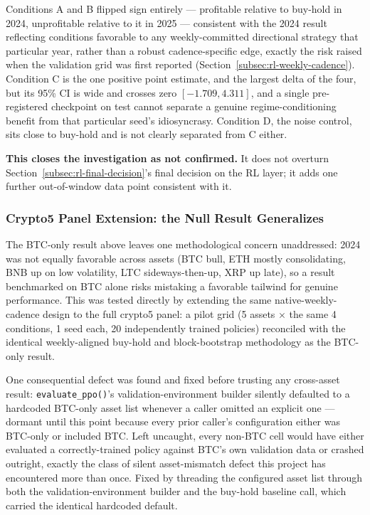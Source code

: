 Conditions A and B flipped sign entirely --- profitable relative to buy-hold in 2024, unprofitable relative to it in 2025 --- consistent with the 2024 result reflecting conditions favorable to any weekly-committed directional strategy that particular year, rather than a robust cadence-specific edge, exactly the risk raised when the validation grid was first reported (Section~\ref{subsec:rl-weekly-cadence}). Condition C is the one positive point estimate, and the largest delta of the four, but its 95\% CI is wide and crosses zero $[-1.709, 4.311]$, and a single pre-registered checkpoint on test cannot separate a genuine regime-conditioning benefit from that particular seed's idiosyncrasy. Condition D, the noise control, sits close to buy-hold and is not clearly separated from C either.

\textbf{This closes the investigation as not confirmed.} It does not overturn Section~\ref{subsec:rl-final-decision}'s final decision on the RL layer; it adds one further out-of-window data point consistent with it.

\subsubsection{Crypto5 Panel Extension: the Null Result Generalizes}
\label{subsubsec:rl-weekly-crypto5}

The BTC-only result above leaves one methodological concern unaddressed: 2024 was not equally favorable across assets (BTC bull, ETH mostly consolidating, BNB up on low volatility, LTC sideways-then-up, XRP up late), so a result benchmarked on BTC alone risks mistaking a favorable tailwind for genuine performance. This was tested directly by extending the same native-weekly-cadence design to the full crypto5 panel: a pilot grid (5 assets $\times$ the same 4 conditions, 1 seed each, 20 independently trained policies) reconciled with the identical weekly-aligned buy-hold and block-bootstrap methodology as the BTC-only result.

One consequential defect was found and fixed before trusting any cross-asset result: \texttt{evaluate\_ppo()}'s validation-environment builder silently defaulted to a hardcoded BTC-only asset list whenever a caller omitted an explicit one --- dormant until this point because every prior caller's configuration either was BTC-only or included BTC. Left uncaught, every non-BTC cell would have either evaluated a correctly-trained policy against BTC's own validation data or crashed outright, exactly the class of silent asset-mismatch defect this project has encountered more than once. Fixed by threading the configured asset list through both the validation-environment builder and the buy-hold baseline call, which carried the identical hardcoded default.

